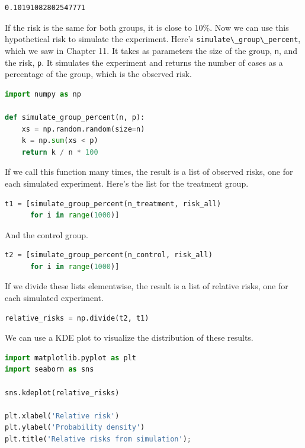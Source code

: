 \begin{lstlisting}[style=output]
0.10191082802547771
\end{lstlisting}

If the risk is the same for both groups, it is close to 10\%. Now we can
use this hypothetical risk to simulate the experiment. Here's
\passthrough{\lstinline!simulate\_group\_percent!}, which we saw in
Chapter 11. It takes as parameters the size of the group,
\passthrough{\lstinline!n!}, and the risk, \passthrough{\lstinline!p!}.
It simulates the experiment and returns the number of cases as a
percentage of the group, which is the observed risk.

\begin{lstlisting}[language=Python,style=source]
import numpy as np

def simulate_group_percent(n, p):
    xs = np.random.random(size=n)
    k = np.sum(xs < p)
    return k / n * 100
\end{lstlisting}

If we call this function many times, the result is a list of observed
risks, one for each simulated experiment. Here's the list for the
treatment group.

\begin{lstlisting}[language=Python,style=source]
t1 = [simulate_group_percent(n_treatment, risk_all)
      for i in range(1000)]
\end{lstlisting}

And the control group.

\begin{lstlisting}[language=Python,style=source]
t2 = [simulate_group_percent(n_control, risk_all)
      for i in range(1000)]
\end{lstlisting}

If we divide these lists elementwise, the result is a list of relative
risks, one for each simulated experiment.

\begin{lstlisting}[language=Python,style=source]
relative_risks = np.divide(t2, t1)
\end{lstlisting}

We can use a KDE plot to visualize the distribution of these results.

\begin{lstlisting}[language=Python,style=source]
import matplotlib.pyplot as plt
import seaborn as sns

sns.kdeplot(relative_risks)

plt.xlabel('Relative risk')
plt.ylabel('Probability density')
plt.title('Relative risks from simulation');
\end{lstlisting}

